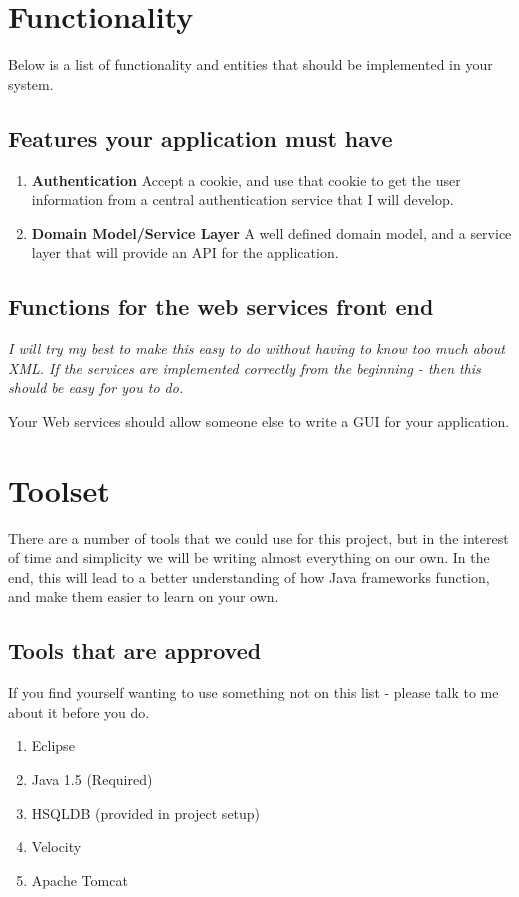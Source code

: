 \documentclass[11pt]{exam}
\begin{document}
\section{Functionality}
Below is a list of functionality and entities that should be implemented in your system.

\subsection*{Features your application must have}
\begin{enumerate}
	\item {\bf Authentication} Accept a cookie, and use that cookie to get the user information from a central authentication service that I will develop.
	\item {\bf Domain Model/Service Layer} A well defined domain model, and a service layer that will provide an API for the application.
\end{enumerate}

\subsection{Functions for the web services front end} 
{\it I will try my best to make this easy to do without having to know too much about XML.  If the services are implemented correctly from the beginning - then this should be easy for you to do.}
\par
Your Web services should allow someone else to write a GUI for your application.

\section{Toolset}
There are a number of tools that we could use for this project, but  in the interest of time and simplicity we will be writing almost everything on our own.  In the end, this will lead to a better understanding of how Java frameworks function, and make them easier to learn on your own.
\par
\subsection{Tools that are approved}
If you find yourself wanting to use something not on this list - please talk to me about it before you do.
\begin{enumerate}
	\item Eclipse
	\item Java 1.5 (Required)
	\item HSQLDB (provided in project setup)
	\item Velocity
	\item Apache Tomcat
\end{enumerate}
\end{document}
